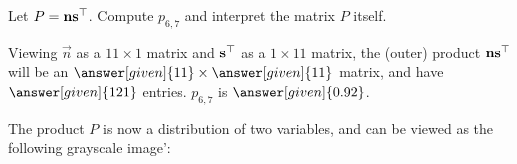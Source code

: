\documentclass{ximera}
\begin{document}
\begin{example}[Distributions]
\begin{center}
  \end{center}
  Let $P = \mathbf{n}\mathbf{s}^\top$. Compute $p_{6,7}$ and interpret
  the matrix $P$ itself.
  \begin{explanation}
    Viewing $\vec{n}$ as a $11\times 1$ matrix and
    $\mathbf{s}^\top$ as a $1 \times 11$ matrix, the (outer) product
    $\mathbf{n}\mathbf{s}^\top$ will be an
    $\answer[given]{11}\times\answer[given]{11}$ matrix, and have
    $\answer[given]{121}$ entries. $p_{6,7}$ is
    $\answer[given]{0.92}$.

    The product $P$ is now a distribution of two variables, and can be
    viewed as the following grayscale image':
    \begin{center}
      \newcommand{\matrixData}{{
          {0,0,0.01,0.03,0.07,0.11,0.13,0.1,0.06,0.03,0.01},
          {0,0,0.02,0.06,0.13,0.22,0.25,0.21,0.13,0.06,0.02},
          {0,0,0.03,0.1,0.24,0.39,0.45,0.37,0.22,0.1,0.04},
          {0,0.01,0.04,0.15,0.35,0.58,0.67,0.55,0.33,0.15,0.05},
          {0,0.01,0.05,0.19,0.45,0.74,0.85,0.7,0.42,0.19,0.07},
          {0,0.01,0.06,0.21,0.49,0.8,0.92,0.76,0.46,0.21,0.07},
          {0,0.01,0.05,0.19,0.45,0.74,0.85,0.7,0.42,0.19,0.07},
          {0,0.01,0.04,0.15,0.35,0.58,0.67,0.55,0.33,0.15,0.05},
          {0,0,0.03,0.1,0.24,0.39,0.45,0.37,0.22,0.1,0.04},
          {0,0,0.02,0.06,0.13,0.22,0.25,0.21,0.13,0.06,0.02},
          {0,0,0.01,0.03,0.07,0.11,0.13,0.1,0.06,0.03,0.01}
      }}
      \newcommand{\skewData}{{
           {0., 0.01, 0.07, 0.26, 0.61, 1., 1.15, 0.95, 0.57, 0.26, 0.09}
      }}
      \newcommand{\normData}{{
          {0.11, 0.22, 0.39, 0.58, 0.74, 0.8, 0.74, 0.58, 0.39, 0.22, 0.11}
      }}
\end{center}
\end{explanation}
\end{example}
\end{document}
